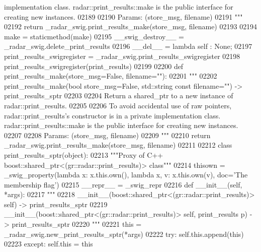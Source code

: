 \begin{DoxyCode}
{{{{{{{{{{       implementation class. radar::print\_results::make is the public interface for creating new instances.}
02189 \textcolor{stringliteral}{}
02190 \textcolor{stringliteral}{        Params: (store\_msg, filename)}
02191 \textcolor{stringliteral}{        """}
02192         \textcolor{keywordflow}{return} \_radar\_swig.print\_results\_make(store\_msg, filename)
02193 
02194     make = staticmethod(make)
02195     \_\_swig\_destroy\_\_ = \_radar\_swig.delete\_print\_results
02196     \_\_del\_\_ = \textcolor{keyword}{lambda} self : \textcolor{keywordtype}{None};
02197 print\_results\_swigregister = \_radar\_swig.print\_results\_swigregister
02198 print_results_swigregister(print\_results)
02199 
02200 \textcolor{keyword}{def }print_results_make(store\_msg=False, filename=""):
02201   \textcolor{stringliteral}{"""}
02202 \textcolor{stringliteral}{    print\_results\_make(bool store\_msg=False, std::string const filename="") -> print\_results\_sptr}
02203 \textcolor{stringliteral}{}
02204 \textcolor{stringliteral}{    Return a shared\_ptr to a new instance of radar::print\_results.}
02205 \textcolor{stringliteral}{}
02206 \textcolor{stringliteral}{    To avoid accidental use of raw pointers, radar::print\_results's constructor is in a private
       implementation class. radar::print\_results::make is the public interface for creating new instances.}
02207 \textcolor{stringliteral}{}
02208 \textcolor{stringliteral}{    Params: (store\_msg, filename)}
02209 \textcolor{stringliteral}{    """}
02210   \textcolor{keywordflow}{return} \_radar\_swig.print\_results\_make(store\_msg, filename)
02211 
02212 \textcolor{keyword}{class }print_results_sptr(object):
02213     \textcolor{stringliteral}{"""Proxy of C++ boost::shared\_ptr<(gr::radar::print\_results)> class"""}
02214     thisown = _swig_property(\textcolor{keyword}{lambda} x: x.this.own(), \textcolor{keyword}{lambda} x, v: x.this.own(v), doc=\textcolor{stringliteral}{'The membership flag'})
02215     \_\_repr\_\_ = \_swig\_repr
02216     \textcolor{keyword}{def }__init__(self, *args): 
02217         \textcolor{stringliteral}{"""}
02218 \textcolor{stringliteral}{        \_\_init\_\_(boost::shared\_ptr<(gr::radar::print\_results)> self) -> print\_results\_sptr}
02219 \textcolor{stringliteral}{        \_\_init\_\_(boost::shared\_ptr<(gr::radar::print\_results)> self, print\_results p) -> print\_results\_sptr}
02220 \textcolor{stringliteral}{        """}
02221         this = \_radar\_swig.new\_print\_results\_sptr(*args)
02222         \textcolor{keywordflow}{try}: self.this.append(this)
02223         \textcolor{keywordflow}{except}: self.this = this
}}}}}}}}}
\end{DoxyCode}
